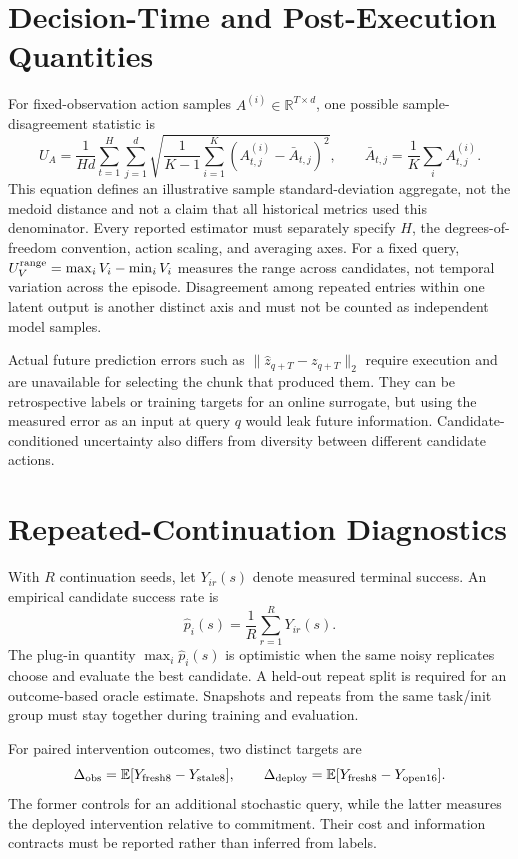 \documentclass{article}
\newcommand{\R}{\mathbb{R}}
\newcommand{\E}{\mathbb{E}}
\begin{document}



\appendix
\section{Decision-Time and Post-Execution Quantities}
For fixed-observation action samples $A^{(i)}\in\R^{T\times d}$, one possible
sample-disagreement statistic is
\begin{equation}
 U_A=\frac{1}{Hd}\sum_{t=1}^{H}\sum_{j=1}^{d}
 \sqrt{\frac{1}{K-1}\sum_{i=1}^{K}
     (A^{(i)}_{t,j}-\bar A_{t,j})^2},\qquad
 \bar A_{t,j}=\frac1K\sum_iA^{(i)}_{t,j}.
 \label{eq:uncertainty-example}
\end{equation}
This equation defines an illustrative sample standard-deviation aggregate,
not the medoid distance and not a claim that all historical metrics used
this denominator. Every reported estimator must separately specify $H$, the
degrees-of-freedom convention, action scaling, and averaging axes.
For a fixed query, $U_V^{\rm range}=\max_iV_i-\min_iV_i$ measures the range
across candidates, not temporal variation across the episode. Disagreement
among repeated entries within one latent output is another distinct axis and
must not be counted as independent model samples.

Actual future prediction errors such as
$\|\widehat z_{q+T}-z_{q+T}\|_2$ require execution and are unavailable for
selecting the chunk that produced them. They can be retrospective labels or
training targets for an online surrogate, but using the measured error as an
input at query $q$ would leak future information. Candidate-conditioned
uncertainty also differs from diversity between different candidate actions.

\section{Repeated-Continuation Diagnostics}
With $R$ continuation seeds, let $Y_{ir}(s)$ denote measured terminal success.
An empirical candidate success rate is
\begin{equation}
 \hat p_i(s)=\frac1R\sum_{r=1}^{R}Y_{ir}(s).
\end{equation}
The plug-in quantity $\max_i\hat p_i(s)$ is optimistic when the same noisy
replicates choose and evaluate the best candidate. A held-out repeat split
is required for an outcome-based oracle estimate. Snapshots and repeats from
the same task/init group must stay together during training and evaluation.

For paired intervention outcomes, two distinct targets are
\begin{equation}
 \Delta_{\rm obs}=\E[Y_{\rm fresh8}-Y_{\rm stale8}],\qquad
 \Delta_{\rm deploy}=\E[Y_{\rm fresh8}-Y_{\rm open16}].
\end{equation}
The former controls for an additional stochastic query, while the latter
measures the deployed intervention relative to commitment. Their cost and
information contracts must be reported rather than inferred from labels.
\end{document}
